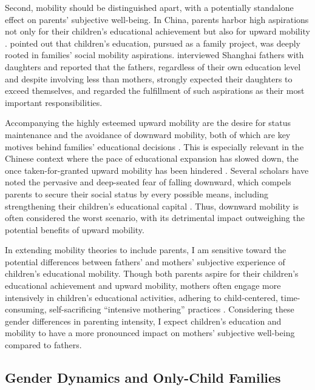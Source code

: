 Second, mobility should be distinguished apart, with a potentially standalone effect on parents' subjective well-being. In China, parents harbor high aspirations not only for their children's educational achievement but also for upward mobility \parencite{duChinesePerceiveUpward2021}. \textcite{guSacrificeIndebtednessIntergenerational2022} pointed out that children's education, pursued as a family project, was deeply rooted in families' social mobility aspirations. \textcite{xuHopingPhoenixShanghai2013} interviewed Shanghai fathers with daughters and reported that the fathers, regardless of their own education level and despite involving less than mothers, strongly expected their daughters to exceed themselves, and regarded the fulfillment of such aspirations as their most important responsibilities.

Accompanying the highly esteemed upward mobility are the desire for status maintenance and the avoidance of downward mobility, both of which are key motives behind families' educational decisions \parencite{breenExplainingEducationalDifferentials1997,mengWhenAnxiousMothers2020}. This is especially relevant in the Chinese context where the pace of educational expansion has slowed down, the once taken-for-granted upward mobility has been hindered \parencite{yeungHigherEducationExpansion2013}. Several scholars have noted the pervasive and deep-seated fear of falling downward, which compels parents to secure their social status by every possible means, including strengthening their children's educational capital \parencite{ehrenreichFearFallingInner1989,mengWhenAnxiousMothers2020}. Thus, downward mobility is often considered the worst scenario, with its detrimental impact outweighing the potential benefits of upward mobility.

In extending mobility theories to include parents, I am sensitive toward the potential differences between fathers' and mothers' subjective experience of children's educational mobility. Though both parents aspire for their children's educational achievement and upward mobility, mothers often engage more intensively in children's educational activities, adhering to child-centered, time-consuming, self-sacrificing “intensive mothering” practices \parencite{mengWhenAnxiousMothers2020,muChangingPatternsDeterminants2022}. Considering these gender differences in parenting intensity, I expect children's education and mobility to have a more pronounced impact on mothers' subjective well-being compared to fathers.

\subsection{Gender Dynamics and Only-Child Families}

